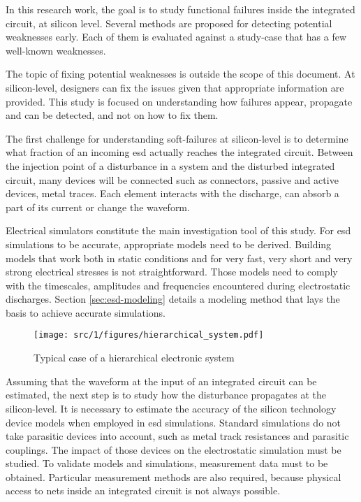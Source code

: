 In this research work, the goal is to study functional failures inside the integrated circuit, at silicon level.
Several methods are proposed for detecting potential weaknesses early.
Each of them is evaluated against a study-case that has a few well-known weaknesses.

The topic of fixing potential weaknesses is outside the scope of this document.
At silicon-level, designers can fix the issues given that appropriate information are provided.
This study is focused on understanding how failures appear, propagate and can be detected, and not on how to fix them.

The first challenge for understanding soft-failures at silicon-level is to determine what fraction of an incoming \gls{esd} actually reaches the integrated circuit.
Between the injection point of a disturbance in a system and the disturbed integrated circuit, many devices will be connected such as connectors, passive and active devices, metal traces.
Each element interacts with the discharge, can absorb a part of its current or change the waveform.

Electrical simulators constitute the main investigation tool of this study.
For \gls{esd} simulations to be accurate, appropriate models need to be derived.
Building models that work both in static conditions and for very fast, very short and very strong electrical stresses is not straightforward.
Those models need to comply with the timescales, amplitudes and frequencies encountered during electrostatic discharges.
Section \ref{sec:esd-modeling} details a modeling method that lays the basis to achieve accurate simulations.

\begin{figure}[!h]
  \centering
  \texttt{[image: src/1/figures/hierarchical\_system.pdf]}
  \caption{Typical case of a hierarchical electronic system}
  \label{fig:ex-electronic-system}
\end{figure}

Assuming that the waveform at the input of an integrated circuit can be estimated, the next step is to study how the disturbance propagates at the silicon-level.
It is necessary to estimate the accuracy of the silicon technology device models when employed in \gls{esd} simulations.
Standard simulations do not take parasitic devices into account, such as metal track resistances and parasitic couplings.
The impact of those devices on the electrostatic simulation must be studied.
To validate models and simulations, measurement data must to be obtained.
Particular measurement methods are also required, because physical access to nets inside an integrated circuit is not always possible.

